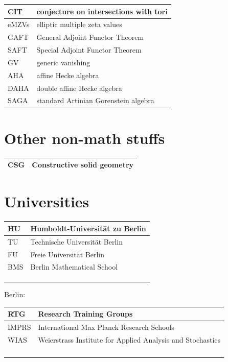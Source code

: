 \documentclass{amsart}
\numberwithin{equation}{section}
\theoremstyle{plain}
\numberwithin{equation}{section}
\theoremstyle{remark}
\begin{document}
\begin{longtable}{l|l}
CIT & conjecture on intersections with tori\\ \hline
eMZVs & elliptic multiple zeta values\\ \hline
GAFT & General Adjoint Functor Theorem\\ \hline
SAFT & Special Adjoint Functor Theorem\\ \hline
GV & generic vanishing\\ \hline
AHA & affine Hecke algebra\\ \hline
DAHA & double affine Hecke algebra\\ \hline
SAGA & standard Artinian Gorenstein algebra\\ \hline
\end{longtable}

\section{Other non-math stuffs}
\begin{longtable}{l|l}
\hline
CSG & Constructive solid geometry\\ \hline
\end{longtable}


\section{Universities}
\begin{longtable}{l|l}
\hline
HU & Humboldt-Universität zu Berlin \\ \hline
TU & Technische Universität Berlin  \\ \hline
FU & Freie Universität Berlin\\ \hline
BMS & Berlin Mathematical School\\ \hline
 & \\ \hline
 & \\ \hline
 & \\ \hline
\end{longtable}

Berlin:
\begin{longtable}{l|l}
\hline
RTG & Research Training Groups \\ \hline
IMPRS & International Max Planck Research Schools  \\ \hline
WIAS & Weierstrass Institute for Applied Analysis and Stochastics\\ \hline
 & \\ \hline
 & \\ \hline
 & \\ \hline
 & \\ \hline
\end{longtable}
\end{document}
